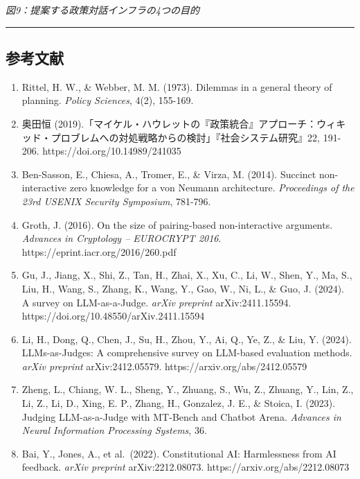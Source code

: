 \pandocbounded{}
\emph{図9：提案する政策対話インフラの4つの目的}

\begin{center}\rule{0.5\linewidth}{0.5pt}\end{center}

\subsection{参考文献}\label{ux53c2ux8003ux6587ux732e}

\begin{enumerate}
\def\labelenumi{\arabic{enumi}.}
\item
  Rittel, H. W., \& Webber, M. M. (1973). Dilemmas in a general theory of planning. \emph{Policy Sciences}, 4(2), 155-169.
\item
  奥田恒 (2019).「マイケル・ハウレットの『政策統合』アプローチ：ウィキッド・プロブレムへの対処戦略からの検討」『社会システム研究』22, 191-206. https://doi.org/10.14989/241035
\item
  Ben-Sasson, E., Chiesa, A., Tromer, E., \& Virza, M. (2014). Succinct non-interactive zero knowledge for a von Neumann architecture. \emph{Proceedings of the 23rd USENIX Security Symposium}, 781-796.
\item
  Groth, J. (2016). On the size of pairing-based non-interactive arguments. \emph{Advances in Cryptology -- EUROCRYPT 2016}. https://eprint.iacr.org/2016/260.pdf
\item
  Gu, J., Jiang, X., Shi, Z., Tan, H., Zhai, X., Xu, C., Li, W., Shen, Y., Ma, S., Liu, H., Wang, S., Zhang, K., Wang, Y., Gao, W., Ni, L., \& Guo, J. (2024). A survey on LLM-as-a-Judge. \emph{arXiv preprint} arXiv:2411.15594. https://doi.org/10.48550/arXiv.2411.15594
\item
  Li, H., Dong, Q., Chen, J., Su, H., Zhou, Y., Ai, Q., Ye, Z., \& Liu, Y. (2024). LLMs-as-Judges: A comprehensive survey on LLM-based evaluation methods. \emph{arXiv preprint} arXiv:2412.05579. https://arxiv.org/abs/2412.05579
\item
  Zheng, L., Chiang, W. L., Sheng, Y., Zhuang, S., Wu, Z., Zhuang, Y., Lin, Z., Li, Z., Li, D., Xing, E. P., Zhang, H., Gonzalez, J. E., \& Stoica, I. (2023). Judging LLM-as-a-Judge with MT-Bench and Chatbot Arena. \emph{Advances in Neural Information Processing Systems}, 36.
\item
  Bai, Y., Jones, A., et al.~(2022). Constitutional AI: Harmlessness from AI feedback. \emph{arXiv preprint} arXiv:2212.08073. https://arxiv.org/abs/2212.08073

\end{enumerate}
